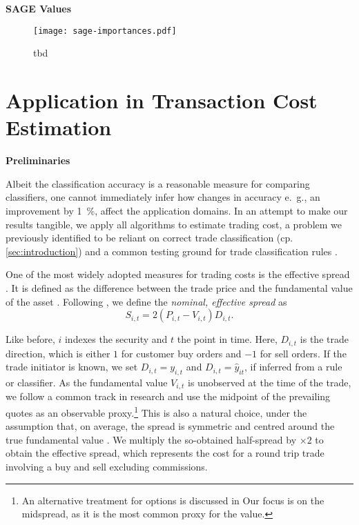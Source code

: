 \textbf{SAGE Values}

\begin{figure}[h!]
    \centering
    \texttt{[image: sage-importances.pdf]}
    \caption[tbd]{tbd}
    \label{fig:sage-importances}
\end{figure}


\clearpage

\section{Application in Transaction Cost Estimation}\label{sec:application}

\textbf{Preliminaries}

Albeit the classification accuracy is a reasonable measure for comparing classifiers, one cannot immediately infer how changes in accuracy e.~g., an improvement by \SI{1}{\percent}, affect the application domains. In an attempt to make our results tangible, we apply all algorithms to estimate trading cost, a problem we previously identified to be reliant on correct trade classification (cp. \cref{sec:introduction}) and a common testing ground for trade classification rules \autocites[cp.][541]{ellisAccuracyTradeClassification2000}[][569]{finucaneDirectTestMethods2000}[][271--278]{petersonEvaluationBiasesExecution2003}[][896--897]{savickasInferringDirectionOption2003}.

One of the most widely adopted measures for trading costs is the effective spread \autocite[][112]{Piwowar_2006}. It is defined as the difference between the trade price and the fundamental value of the asset \autocite[][238--239]{bessembinderIssuesAssessingTrade2003}. Following \textcite[][238--239]{bessembinderIssuesAssessingTrade2003}, we define the \emph{nominal, effective spread} as
\begin{equation}
    S_{i,t} = 2 (P_{i,t} - V_{i,t}) D_{i,t}.
    \label{eq:effective-spread}
\end{equation}

Like before, $i$ indexes the security and $t$ the point in time. Here, $D_{i,t}$ is the trade direction, which is either $1$ for customer buy orders and $-1$ for sell orders. If the trade initiator is known, we set $D_{i,t} = y_{i,t}$ and $D_{i,t}=\hat{y}_{it}$, if inferred from a rule or classifier. As the fundamental value $V_{i,t}$ is unobserved at the time of the trade, we follow a common track in research and use the midpoint of the prevailing quotes as an observable proxy.\footnote{An alternative treatment for options is discussed in \textcite[][4975--4976]{muravyevOptionsTradingCosts2020} Our focus is on the midspread, as it is the most common proxy for the value.} This is also a natural choice, under the assumption that, on average, the spread is symmetric and centred around the true fundamental value \autocite[][1018]{leeMarketIntegrationPrice1993}. We multiply the so-obtained half-spread by $\times 2$ to obtain the effective spread, which represents the cost for a round trip trade involving a buy and sell excluding commissions.

